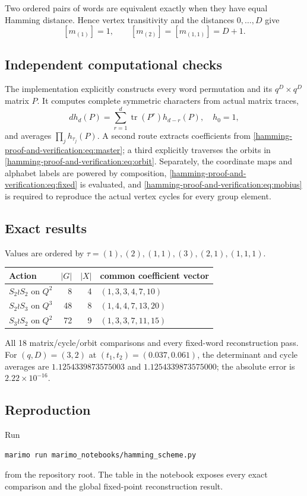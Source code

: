 \documentclass[10pt]{article}
\begin{document}
Two ordered pairs of words are equivalent exactly when they have equal
Hamming distance.  Hence vertex transitivity and the distances $0,\ldots,D$
give
\[
[m_{(1)}]=1,\qquad [m_{(2)}]=[m_{(1,1)}]=D+1.
\]

\subsection{Independent computational checks}
The implementation explicitly constructs every word permutation and its
$q^D\times q^D$ matrix $P$.  It computes complete symmetric characters from
actual matrix traces,
\[
d h_d(P)=\sum_{r=1}^d\operatorname{tr}(P^r)h_{d-r}(P),\quad h_0=1,
\]
and averages $\prod_jh_{\tau_j}(P)$.  A second route extracts coefficients
from \eqref{hamming-proof-and-verification:eq:master}; a third explicitly traverses the orbits in
\eqref{hamming-proof-and-verification:eq:orbit}.  Separately, the coordinate maps and alphabet labels are
powered by composition, \eqref{hamming-proof-and-verification:eq:fixed} is evaluated, and \eqref{hamming-proof-and-verification:eq:mobius}
is required to reproduce the actual vertex cycles for every group element.

\subsection{Exact results}
Values are ordered by
$\tau=(1),(2),(1,1),(3),(2,1),(1,1,1)$.
\begin{center}
\begin{tabular}{@{}lrrl@{}}
\toprule
Action & $|G|$ & $|X|$ & common coefficient vector\\
\midrule
$S_2\wr S_2$ on $Q^2$ & 8 & 4 & $(1,3,3,4,7,10)$\\
$S_2\wr S_3$ on $Q^3$ & 48 & 8 & $(1,4,4,7,13,20)$\\
$S_3\wr S_2$ on $Q^2$ & 72 & 9 & $(1,3,3,7,11,15)$\\
\bottomrule
\end{tabular}
\end{center}
All 18 matrix/cycle/orbit comparisons and every fixed-word reconstruction
pass.  For $(q,D)=(3,2)$ at $(t_1,t_2)=(0.037,0.061)$, the determinant and
cycle averages are $1.1254339873575003$ and $1.1254339873575000$; the absolute
error is $2.22\times10^{-16}$.

\subsection{Reproduction}
Run
\begin{verbatim}
marimo run marimo_notebooks/hamming_scheme.py
\end{verbatim}
from the repository root.  The table in the notebook exposes every exact
comparison and the global fixed-point reconstruction result.
\endgroup
\end{document}

